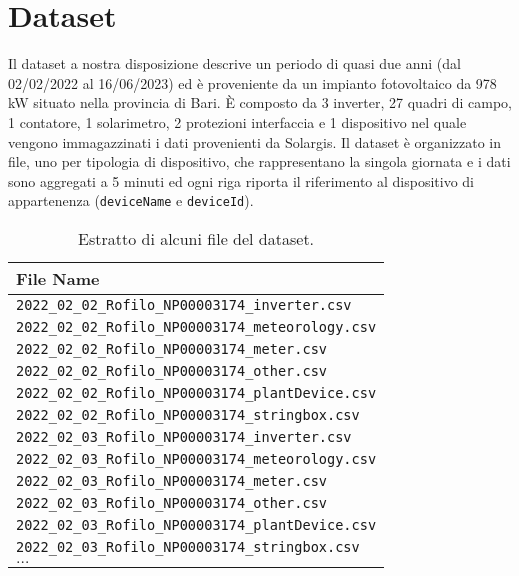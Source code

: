 \section{Dataset}

Il dataset a nostra disposizione descrive un periodo di quasi due anni (dal
02/02/2022 al 16/06/2023) ed è proveniente da un impianto fotovoltaico da 978 kW
situato nella provincia di Bari. È composto da
3 inverter, 27 quadri di campo, 1 contatore, 1 solarimetro, 2 protezioni
interfaccia e 1 dispositivo  nel quale vengono immagazzinati
i dati provenienti da Solargis. Il dataset è organizzato in file, uno per
tipologia di dispositivo, che
rappresentano la singola giornata e i dati sono aggregati a 5 minuti ed ogni
riga riporta il riferimento al
dispositivo di appartenenza (\verb|deviceName| e \verb|deviceId|).

\begin{table}[H]
	\begin{center}
		\begin{tabular}[c]{l}
			\hline
			\textbf{File Name}                                  \\
			\hline
			\verb|2022_02_02_Rofilo_NP00003174_inverter.csv|    \\
			\verb|2022_02_02_Rofilo_NP00003174_meteorology.csv| \\
			\verb|2022_02_02_Rofilo_NP00003174_meter.csv|       \\
			\verb|2022_02_02_Rofilo_NP00003174_other.csv|       \\
			\verb|2022_02_02_Rofilo_NP00003174_plantDevice.csv| \\
			\verb|2022_02_02_Rofilo_NP00003174_stringbox.csv|   \\
			\verb|2022_02_03_Rofilo_NP00003174_inverter.csv|    \\
			\verb|2022_02_03_Rofilo_NP00003174_meteorology.csv| \\
			\verb|2022_02_03_Rofilo_NP00003174_meter.csv|       \\
			\verb|2022_02_03_Rofilo_NP00003174_other.csv|       \\
			\verb|2022_02_03_Rofilo_NP00003174_plantDevice.csv| \\
			\verb|2022_02_03_Rofilo_NP00003174_stringbox.csv|   \\
			$\ldots$                                            \\
			\hline
		\end{tabular}
	\end{center}
	\caption{Estratto di alcuni file del dataset.}\label{tab:datasunto}
\end{table}

